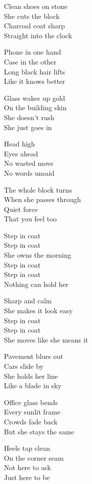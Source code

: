 \begin{lyrics}
Clean shoes on stone\\
She cuts the block\\
Charcoal coat sharp\\
Straight into the clock

Phone in one hand\\
Case in the other\\
Long black hair lifts\\
Like it knows better

Glass wakes up gold\\
On the building skin\\
She doesn't rush\\
She just goes in

Head high\\
Eyes ahead\\
No wasted move\\
No words unsaid

The whole block turns\\
When she passes through\\
Quiet force\\
That you feel too

Step in coat\\
Step in coat\\
She owns the morning\\
Step in coat\\
Step in coat\\
Nothing can hold her

Sharp and calm\\
She makes it look easy\\
Step in coat\\
Step in coat\\
She moves like she means it

Pavement blurs out\\
Cars slide by\\
She holds her line\\
Like a blade in sky

Office glass bends\\
Every sunlit frame\\
Crowds fade back\\
But she stays the same

Heels tap clean\\
On the corner seam\\
Not here to ask\\
Just here to be


\end{lyrics}
